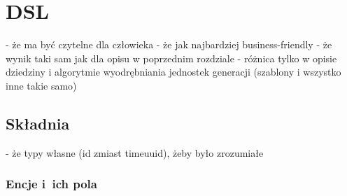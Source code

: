 \chapter{DSL}

- że ma być czytelne dla człowieka
- że jak najbardziej business-friendly
- że wynik taki sam jak dla opisu w poprzednim rozdziale
- różnica tylko w opisie dziedziny i algorytmie wyodrębniania jednostek generacji (szablony i wszystko inne takie samo)

\section{Składnia}

- że typy własne (id zmiast timeuuid), żeby było zrozumiałe


\subsection{Encje i~ich pola}

